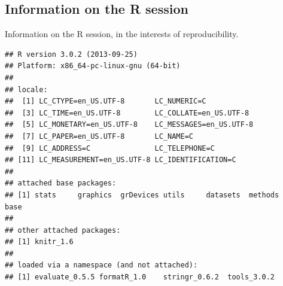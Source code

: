 \subsection{Information on the R session}
Information on the R session, in the interests of reproducibility.
\begin{knitrout}
\color{fgcolor}\begin{kframe}
\begin{verbatim}
## R version 3.0.2 (2013-09-25)
## Platform: x86_64-pc-linux-gnu (64-bit)
## 
## locale:
##  [1] LC_CTYPE=en_US.UTF-8       LC_NUMERIC=C              
##  [3] LC_TIME=en_US.UTF-8        LC_COLLATE=en_US.UTF-8    
##  [5] LC_MONETARY=en_US.UTF-8    LC_MESSAGES=en_US.UTF-8   
##  [7] LC_PAPER=en_US.UTF-8       LC_NAME=C                 
##  [9] LC_ADDRESS=C               LC_TELEPHONE=C            
## [11] LC_MEASUREMENT=en_US.UTF-8 LC_IDENTIFICATION=C       
## 
## attached base packages:
## [1] stats     graphics  grDevices utils     datasets  methods   base     
## 
## other attached packages:
## [1] knitr_1.6
## 
## loaded via a namespace (and not attached):
## [1] evaluate_0.5.5 formatR_1.0    stringr_0.6.2  tools_3.0.2
\end{verbatim}
\end{kframe}
\end{knitrout}


